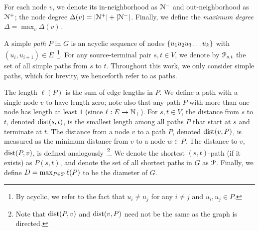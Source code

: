 
For each node $v$, we denote its in-neighborhood as $\Nb$ and out-neighborhood as $\Nf$; the node degree $\Delta(v) = |\Nf|+|\Nb|$.
Finally, we define the \emph{maximum degree} $\Delta = \max_v\Delta(v)$.


A simple \emph{path} $P$ in $G$ is an acyclic sequence of nodes  $\crl*{u_1u_2u_3\ldots u_k}$ with $(u_i,u_{i+1})\in E$~\footnote{By acyclic, we refer to the fact that $u_i\neq u_j$ for any $i\neq j$ and $u_i,u_j\in P$.}. 
For any source-terminal pair $s,t\in V$, we denote by $\calP_{s,t}$ the set of all simple paths from $s$ to $t$.
Throughout this work, we only consider simple paths, which for brevity, we henceforth refer to as paths.

The length $\ell(P)$ is the sum of edge lengths in $P$. We define a path with a single node $v$ to have length zero; note also that any path $P$ with more than one node has length at least $1$ (since $\ell:E\to \N_+$).
For $s,t\in V$, the distance from $s$ to $t$, denoted $\dist(s,t)$, is the smallest length among all paths $P$ that start at $s$ and terminate at $t$.
The distance from a node $v$ to a path $P$, denoted $\dist(v,P)$, is measured as the minimum distance from $v$ to a node $w\in P$.
The distance to $v$, $\dist(P,v)$, is defined analogously~\footnote{Note that  $\dist(P,v)$ and  $\dist(v,P)$ need not be the same as the graph is directed.}.
We denote the shortest $(s,t)$-path (if it exists) as $P(s,t)$, and denote the set of all shortest paths in $G$ as $\calP$.
Finally, we define $D=\max_{P\in\calP}\ell(P)$ to be the diameter of $G$.


